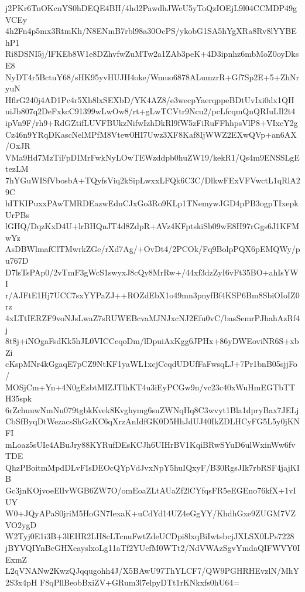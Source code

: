 j2PKr6TnOKcnYS0hDEQE4BH/4hd2PawdhJWeU5yToQzIOEjL9l04CCMDP49gVCEy
4h2Fn4p5mx3RtmKh/N8ENmB7rbl98a30OcPS/ykobG1SA5hYgXRa8Rv8lYYBEhP1
Ri8DSNI5j/lFKEb8W1e8DZhvfwZuMTw2a1ZAb3peK+4D3ipnhz6mbMoZ0oyDksE8
NyDT4r5BctuY68/sHK95yvHUJH4oke/Wmuo6878ALumzrR+Gf7Sp2E+5+ZhNryuN
HflrG240j4AD1Pc4r5Xh8lxSEXbD/YK4AZ8/e3wecpYaerqppeBDtUvIxi0dx1QH
uiJb807q2DeFxkcC91399wLwOw8/rt+gLwTCVtr9Ncu2/pcLfcqmQnQRIuLIl2t4
ipVn9F/rh9+RdGZtifLUVFBUkzNifwIzhDkRl9fW5zFiRuFFhhpsVlP8+VIxcY2g
Cz46n9YRqDKascNelMPfM8Vtew0HI7Uwz3XF8Kaf8IjWWZ2EXwQVp+an6AX/OxJR
VMa9Hd7MzTiFpDIMrFwkNyLOwTEWzddpb0huZW19/kekR1/Qs4m9ENSSLgEtezLM
7hYGuWISfVbosbA+TQyfsViq2kSipLwxxLFQk6C3C/DlkwFExVFVwctL1qRlA29C
hITKIPuxxPAwTMRDEazwEdnCJxGo3Ro9KLp1TNemywJGD4pPB3ogpTIxepkUrPBs
lGHQ/DqzKxD4U+lrBHQnJT4d8ZdpR+AVz4KFptskiSb09wE8H97rGgs6J1KFMwYz
AsDBWlmafClTMwrkZGe/rXd7Ag/+OvDt4/2PCOk/Fq9BolpPQX6pEMQWy/pu767D
D7lsTsPAp0/2vTmF3gWcS1swyxJ8cQy8MrRw+/44xf3dzZyI6vFt35BO+ahIsYWI
r/AJFtE1Hj7UCC7sxYYPaZJ++ROZdEbX1o49mn3pnyfBf4KSP6Bm8SbiOIoIZ0rz
4xLTtIERZF9voNJsLwaZ7sRUWEBcvaMJNJxcNJ2Efu0vC/basSemrPJhahAzRf4j
8t8j+iNOgaFsdKk5hJL0VICCeqoDm/lDpuiAxKgg6JPHx+86yDWEoviNR6S+xbZi
cKspMNr4kGgaqE7pCZ9NtKF1yaWL1xcjCcqdUDUfFaFwsqLJ+7Pr1bnB05sjjFo/
MOSjCm+Yn+4N0gEzbtMIZJTlhKT4u3iEyPCGw9n/vc23c40xWuHmEGTbTTH35spk
6rZchuuwNmNu079tgbkKvek8Kvghymg6suZWNqHq8C3wvyt1Bla1dpryBax7JELj
CbSfByqDtWezacsShGzKC6qXrzAnIdfGK0D5HhJdUJ40IkZDLHCyFG5L5y0jKNFI
mLoaz5sUIe4ABuJry88KYRufDEsKCJh6UIHrBV1KqiBRwSYuD6ulWxinWw6fvTDE
QhzPBoitmMpdDLvFIsDEOcQYpVdJvxNpY5huIQxyF/B30RgsJIk7rbRSF4jajKIB
Gc3jnKOjvoeElIvWGB6ZW7O/omEoaZLtAUaZf2lCYfqsFR5eEGEno76kfX+1vIUY
W0+JQyAPaS0jriM5HoGN7IexaK+uCdYd14UZ4eGgYY/KhdhGxe9ZUGM7VZVO2ygD
W2Tyj0E1i3B+3lEHR2LH8cLTcnuFwtZdeUCDpi8lxqBiIwtsbcjJXLSX0LPs7228
jBYVQIYnBcGHXeayslxoLg11aTf2YUcfM0WTt2/NdVWAzSgvYmdaQIFWVY0IExmZ
L2qVNANw2KwzQJqqugohh4J/X5BAwU97ThYLCF7/QW9PGHRHEvzlN/MhY2S3x4pH
F8qPllBeobBxiZV+GRum3l7elpyDTt1rKNkxfs0hU64=
